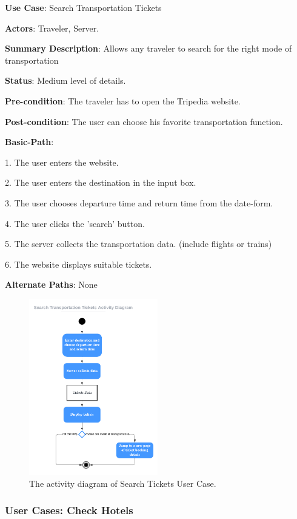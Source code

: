\documentclass[conference]{IEEEtran}
\begin{document}
\textbf{ }

\textbf{Use Case}: Search Transportation Tickets

\textbf{Actors}: Traveler, Server.

\textbf{Summary Description}: Allows any traveler to search for the right mode of transportation

\textbf{Status}: Medium level of details.

\textbf{Pre-condition}: The traveler has to open the Tripedia website.

\textbf{Post-condition}: The user can choose his favorite transportation function.

\textbf{Basic-Path}:

1. The user enters the website.

2. The user enters the destination in the input box.

3. The user chooses departure time and return time from the date-form.

4. The user clicks the 'search' button.

5. The server collects the transportation data. (include flights or trains)

6. The website displays suitable tickets. 


\textbf{Alternate Paths}: None


\begin{figure}[htbp]
	\centerline{\includegraphics[width=0.5\textwidth]{activity_diagram_ticket.pdf}}
	\caption{The activity diagram of Search Tickets User Case.}
	\label{fig8}
\end{figure}


\subsubsection{User Cases: Check Hotels}
\end{document}
